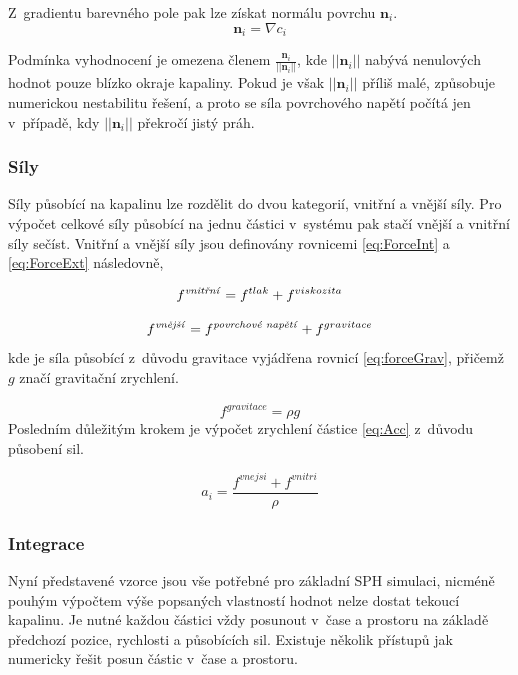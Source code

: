 Z~gradientu barevného pole pak lze získat normálu povrchu $\mathbf{n}_i$.
\begin{equation}
	\mathbf{n}_i = \nabla c_i
	\label{eq:SurfNormal}
\end{equation}

Podmínka vyhodnocení je omezena členem $\frac{\mathbf{n}_i}{||\mathbf{n}_i||}$, kde $||\mathbf{n}_i||$ nabývá nenulových hodnot pouze blízko okraje kapaliny. Pokud je však $||\mathbf{n}_i||$ příliš malé, způsobuje numerickou nestabilitu řešení, a proto se síla povrchového napětí počítá jen v~případě, kdy $||\mathbf{n}_i||$ překročí jistý práh.


\subsubsection{Síly}
Síly působící na kapalinu lze rozdělit do dvou kategorií, vnitřní a vnější síly. Pro výpočet celkové síly působící na jednu částici v~systému pak stačí vnější a vnitřní síly sečíst. Vnitřní a vnější síly jsou definovány rovnicemi \ref{eq:ForceInt} a \ref{eq:ForceExt} následovně, \cite{KelagerSPH}

\begin{equation}
	f^{\text{\textit{vnitřní}}} = f^{tlak} + f^{viskozita}
	\label{eq:ForceInt}
\end{equation}

\begin{equation}
	f^{\text{\textit{vnější}}} = f^{\text{\textit{povrchové napětí}}} + f^{gravitace}
	\label{eq:ForceExt}
\end{equation}
kde je síla působící z~důvodu gravitace vyjádřena rovnicí \ref{eq:forceGrav}, přičemž $g$ značí gravitační zrychlení.

\begin{equation}
	f^{gravitace} = \rho g
	\label{eq:forceGrav}
\end{equation}
Posledním důležitým krokem je výpočet zrychlení částice \ref{eq:Acc} z~důvodu působení sil.

\begin{equation}
	a_i = \frac{f^{vnejsi} + f^{vnitri}}{\rho}
	\label{eq:Acc}
\end{equation}

\subsubsection{Integrace}
Nyní představené vzorce jsou vše potřebné pro základní SPH simulaci, nicméně pouhým výpočtem výše popsaných vlastností hodnot nelze dostat tekoucí kapalinu. Je nutné každou částici vždy posunout v~čase a prostoru na základě předchozí pozice, rychlosti a působících sil. Existuje několik přístupů jak numericky řešit posun částic v~čase a prostoru.

